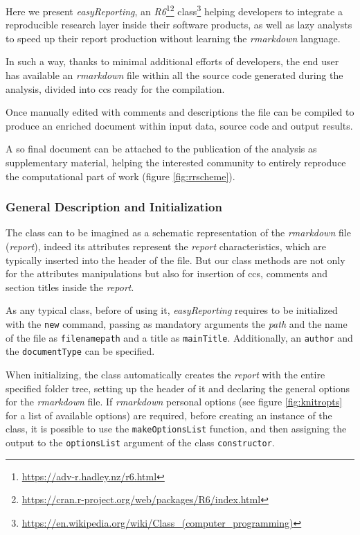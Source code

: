 Here we present \textit{easyReporting}, an \textit{R6}\footnote{\url{https://adv-r.hadley.nz/r6.html}}\footnote{\url{https://cran.r-project.org/web/packages/R6/index.html}} class\footnote{\url{https://en.wikipedia.org/wiki/Class_(computer_programming)}} helping developers to integrate a reproducible research layer inside their software products, as well as lazy analysts to speed up their report production without learning the \textit{rmarkdown} language.

In such a way, thanks to minimal additional efforts of developers, the end user has available an \textit{rmarkdown} file within all the source code generated during the analysis, divided into \glspl{cc} ready for the compilation.

Once manually edited with comments and descriptions the file can be compiled to produce an enriched document within input data, source code and output results.

A so final document can be attached to the publication of the analysis as supplementary material, helping the interested community to entirely reproduce the computational part of work (figure \ref{fig:rrscheme}). 

\subsubsection{General Description and Initialization}

The class can to be imagined as a schematic representation of the \textit{rmarkdown} file (\textit{report}), indeed 
its attributes represent the \textit{report} characteristics, which are typically inserted into the header of the file.
But our class methods are not only for the attributes manipulations but also for insertion of \glspl{cc}, comments and section titles inside the \textit{report}.

As any typical class, before of using it, \textit{easyReporting} requires to be initialized with the \lstinline!new! command, passing as mandatory arguments the \textit{path} and the name of the file as \lstinline!filenamepath! and a title as \lstinline!mainTitle!.
Additionally, an \lstinline!author! and the \lstinline!documentType! can be specified.

When initializing, the class automatically creates the \textit{report} with the entire specified folder tree, setting up the header of it and declaring the general options for the \textit{rmarkdown} file.
If \textit{rmarkdown} personal options (see figure \ref{fig:knitropts} for a list of available options) are required, before creating an instance of the class, it is possible to use the \lstinline!makeOptionsList! function, and then assigning the output to the \lstinline!optionsList! argument of the class \lstinline!constructor!.

